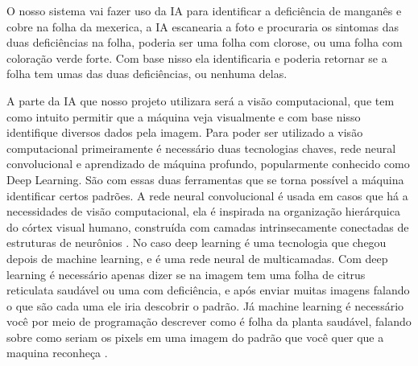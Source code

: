 O nosso sistema vai fazer uso  da IA para identificar a deficiência de manganês e cobre na folha da mexerica, a IA escanearia a foto e procuraria os sintomas das duas deficiências na folha, poderia ser uma folha com clorose, ou uma folha com coloração verde forte. Com base nisso ela identificaria e poderia retornar se a folha tem umas das duas deficiências, ou nenhuma delas.

A parte da IA que nosso projeto utilizara será a visão computacional, que tem como intuito permitir que a máquina veja visualmente e com base nisso identifique diversos dados pela imagem. Para poder ser utilizado a visão computacional primeiramente é necessário duas tecnologias chaves, rede neural convolucional e aprendizado de máquina profundo, popularmente conhecido como Deep Learning. São com essas duas ferramentas que se torna possível a máquina identificar certos padrões. A rede neural convolucional é usada em casos que há a necessidades de visão computacional, ela é inspirada na organização hierárquica do córtex visual humano,  construída com camadas intrinsecamente conectadas de estruturas de neurônios \cite{IntroduçãoRedeNeural}. No caso deep learning é uma tecnologia que chegou depois de machine learning, e é uma rede neural de multicamadas. Com deep learning é necessário apenas dizer se na imagem tem uma folha de citrus reticulata saudável ou uma com deficiência, e após enviar muitas imagens falando o que são cada uma ele iria descobrir o padrão. Já machine learning é necessário você por meio de programação descrever como é folha da planta saudável, falando sobre como seriam os pixels em uma imagem do padrão que você quer que a maquina reconheça \cite{IntroduçãoDeepLearning}.   